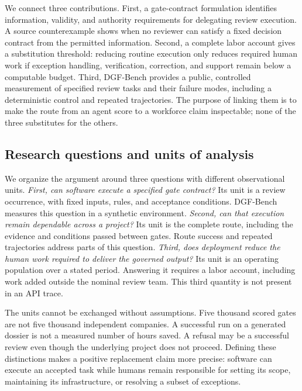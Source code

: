We connect three contributions. First, a gate-contract formulation identifies information,
validity, and authority requirements for delegating review execution. A source counterexample
shows when no reviewer can satisfy a fixed decision contract from the permitted information.
Second, a complete labor account gives a substitution threshold: reducing routine execution
only reduces required human work if exception handling, verification, correction, and support
remain below a computable budget. Third, DGF-Bench provides a public, controlled measurement
of specified review tasks and their failure modes, including a deterministic control and
repeated trajectories. The purpose of linking them is to make the route from an agent score
to a workforce claim inspectable; none of the three substitutes for the others.

\subsection{Research questions and units of analysis}

We organize the argument around three questions with different observational units.
\emph{First, can software execute a specified gate contract?} Its unit is a review occurrence,
with fixed inputs, rules, and acceptance conditions. DGF-Bench measures this question in a
synthetic environment. \emph{Second, can that execution remain dependable across a project?}
Its unit is the complete route, including the evidence and conditions passed between gates.
Route success and repeated trajectories address parts of this question. \emph{Third, does
deployment reduce the human work required to deliver the governed output?} Its unit is an
operating population over a stated period. Answering it requires a labor account, including
work added outside the nominal review team. This third quantity is not present in an API trace.

The units cannot be exchanged without assumptions. Five thousand scored gates are not five
thousand independent companies. A successful run on a generated dossier is not a measured
number of hours saved. A refusal may be a successful review even though the underlying project
does not proceed. Defining these distinctions makes a positive replacement claim more precise:
software can execute an accepted task while humans remain responsible for setting its scope,
maintaining its infrastructure, or resolving a subset of exceptions.

